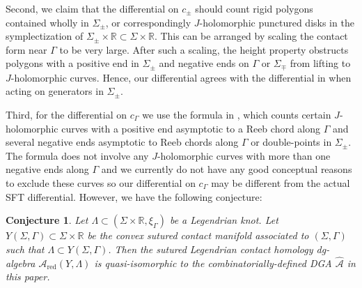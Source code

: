 \documentclass[11pt]{amsart}
\theoremstyle{mystyle}
\newtheorem{conjecture}[conjecture]{Conjecture}
\newcommand{\R}{\mathbb{R}}
\newcommand{\<}{\langle}
\renewcommand{\>}{\rangle}
\begin{document}
Second, we claim that the differential on $c_\pm$ should count rigid polygons contained wholly in $\Sigma_\pm$, or correspondingly $J$-holomorphic punctured disks in the symplectization of $\Sigma_\pm \times \R\subset \Sigma\times \R$.  This can be arranged by scaling the contact form near $\Gamma$ to be very large. After such a scaling, the height property obstructs polygons with a positive end in $\Sigma_\pm$ and negative ends on $\Gamma$ or $\Sigma_\mp$ from lifting to $J$-holomorphic curves. Hence, our differential agrees with the differential in \cite{chekanov2002dga} when acting on generators in $\Sigma_\pm$. 

Third, for the differential on $c_\Gamma$ we use the formula in \cite[Lemma 2.3]{ekholm2016nonloose}, which counts certain $J$-holomorphic curves with a positive end asymptotic to a Reeb chord along $\Gamma$ and several negative ends asymptotic to Reeb chords along $\Gamma$ or double-points in $\Sigma_\pm$. The formula does not involve any $J$-holomorphic curves with more than one negative ends along $\Gamma$ and we currently do not have any good conceptual reasons to exclude these curves so our differential on $c_\Gamma$ may be different from the actual SFT differential. However, we have the following conjecture: \begin{conjecture}
    Let $\Lambda \subset (\Sigma \times \R, \xi_\Gamma)$ be a Legendrian knot. Let $Y(\Sigma, \Gamma) \subset \Sigma \times \R$ be the convex sutured contact manifold associated to $(\Sigma, \Gamma)$ such that $\Lambda \subset Y(\Sigma, \Gamma)$. Then the sutured Legendrian contact homology dg-algebra $\mathcal{A}_{\text{red}}(Y, \Lambda)$ is quasi-isomorphic to the combinatorially-defined DGA $\widehat{\mathcal{A}}$ in this paper.

\end{conjecture}
\end{document}
